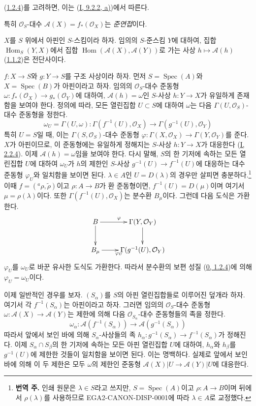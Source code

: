 (\hyperref[II.1.2.4-ko]{1.2.4})를 고려하면, 이는
(\hyperref[I.9.2.2-ko]{I, 9.2.2, a)})에서 따른다.

특히 $\mathcal{O}_S$-대수
$\mathcal{A}(X)=f_*(\mathcal{O}_X)$는 \emph{준연접}이다.

\begin{env}[1.2.7]
\label{II.1.2.7-ko}
$X$를 $S$ 위에서 아핀인 $S$-스킴이라 하자. 임의의 $S$-준스킴
$Y$에 대하여, 집합 $\operatorname{Hom}_S(Y,X)$에서 집합
$\operatorname{Hom}(\mathcal{A}(X),\mathcal{A}(Y))$로 가는 사상
$h\mapsto\mathcal{A}(h)$
(\hyperref[II.1.1.2-ko]{1.1.2})은 전단사이다.
\end{env}

$f:X\to S$와 $g:Y\to S$를 구조 사상이라 하자. 먼저
$S=\operatorname{Spec}(A)$와 $X=\operatorname{Spec}(B)$가
아핀이라고 하자. 임의의 $\mathcal{O}_S$-대수 준동형
$\omega:f_*(\mathcal{O}_X)\to g_*(\mathcal{O}_Y)$에 대하여,
$\mathcal{A}(h)=\omega$인 $S$-사상 $h:Y\to X$가 유일하게 존재함을
보여야 한다. 정의에 따라, 모든 열린집합 $U\subset S$에 대하여
$\omega$는 다음 $\Gamma(U,\mathcal{O}_S)$-대수 준동형을 정한다.
\[
  \omega_U=\Gamma(U,\omega):
  \Gamma(f^{-1}(U),\mathcal{O}_X)\to
  \Gamma(g^{-1}(U),\mathcal{O}_Y)
\]
특히 $U=S$일 때, 이는 $\Gamma(S,\mathcal{O}_S)$-대수 준동형
$\varphi:\Gamma(X,\mathcal{O}_X)\to\Gamma(Y,\mathcal{O}_Y)$를
준다. $X$가 아핀이므로, 이 준동형에는 유일하게 정해지는
$S$-사상 $h:Y\to X$가 대응한다
(\hyperref[I.2.2.4-ko]{I, 2.2.4}). 이제
$\mathcal{A}(h)=\omega$임을 보여야 한다. 다시 말해, $S$의 한 기저에
속하는 모든 열린집합 $U$에 대하여 $\omega_U$가 $h$의 제한인
$S$-사상 $g^{-1}(U)\to f^{-1}(U)$에 대응하는 대수 준동형
$\varphi_U$와 일치함을 보이면 된다. $\lambda\in A$인
$U=D(\lambda)$의 경우만 살피면 충분하다.\footnote{\textbf{번역 주.}
인쇄 원문은 $\lambda\in S$라고 쓰지만, $S=\operatorname{Spec}(A)$이고
$\rho:A\to B$이며 뒤에서 $\rho(\lambda)$를 사용하므로
EGA2-CANON-DISP-0001에 따라 $\lambda\in A$로 교정했다.} 이때
$f=({}^a\rho,\widetilde{\rho})$이고 $\rho:A\to B$가 환 준동형이면,
$f^{-1}(U)=D(\mu)$이며 여기서 $\mu=\rho(\lambda)$이다. 또한
$\Gamma(f^{-1}(U),\mathcal{O}_X)$는 분수환 $B_\mu$이다. 그런데 다음
도식은 가환한다.
\[
  \xymatrix{
    B\ar[r]^\varphi\ar[d] & \Gamma(Y,\mathcal{O}_Y)\ar[d]\\
    B_\mu\ar[r]_{\varphi_U} & \Gamma(g^{-1}(U),\mathcal{O}_Y)
  }
\]
$\varphi_U$를 $\omega_U$로 바꾼 유사한 도식도 가환한다. 따라서
분수환의 보편 성질
(\hyperref[0.1.2.4-ko]{0, 1.2.4})에 의해
$\varphi_U=\omega_U$이다.

이제 일반적인 경우를 보자. $(S_\alpha)$를 $S$의 아핀 열린집합들로
이루어진 덮개라 하자.
여기서 각 $f^{-1}(S_\alpha)$는 아핀이라고 하자. 그러면 임의의
$\mathcal{O}_S$-대수 준동형
$\omega:\mathcal{A}(X)\to\mathcal{A}(Y)$는 제한에 의해 다음
$\mathcal{O}_{S_\alpha}$-대수 준동형들의 족을 정한다.
\[
  \omega_\alpha:
  \mathcal{A}(f^{-1}(S_\alpha))\to
  \mathcal{A}(g^{-1}(S_\alpha))
\]
따라서 앞에서 보인 바에 의해 $S_\alpha$-사상들의 족
$h_\alpha:g^{-1}(S_\alpha)\to f^{-1}(S_\alpha)$가 정해진다. 이제
$S_\alpha\cap S_\beta$의 한 기저에 속하는 모든 아핀 열린집합 $U$에
대하여, $h_\alpha$와 $h_\beta$를 $g^{-1}(U)$에 제한한 것들이
일치함을 보이면 된다. 이는 명백하다. 실제로 앞에서 보인 바에 의해
이 두 제한은 모두 $\omega$의 제한인 준동형
$\mathcal{A}(X)|U\to\mathcal{A}(Y)|U$에 대응한다.

